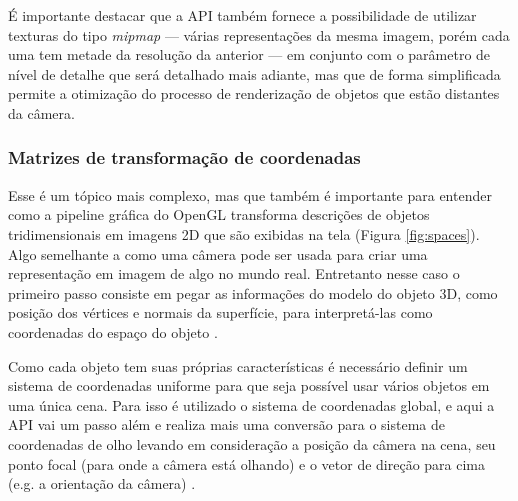 É importante destacar que a API também fornece a possibilidade de utilizar texturas do tipo \textit{mipmap} --- várias representações da mesma imagem, porém cada uma tem metade da resolução da anterior --- em conjunto com o parâmetro de nível de detalhe que será detalhado mais adiante, mas que de forma simplificada permite a otimização do processo de renderização de objetos que estão distantes da câmera. 

\subsubsection{Matrizes de transformação de coordenadas}
\label{sec:matrizes-transformacao-coordenadas}

Esse é um tópico mais complexo, mas que também é importante para entender como a pipeline gráfica do OpenGL transforma descrições de objetos tridimensionais em imagens 2D que são exibidas na tela (Figura \ref{fig:spaces}). Algo semelhante a como uma câmera pode ser usada para criar uma representação em imagem de algo no mundo real. Entretanto nesse caso o primeiro passo consiste em pegar as informações do modelo do objeto 3D, como posição dos vértices e normais da superfície, para interpretá-las como coordenadas do espaço do objeto \cite{GLSLBook}. 

	\begin{figure}[htp]
		\centering
	\end{figure}
	\nocite{spaces}

Como cada objeto tem suas próprias características é necessário definir um sistema de coordenadas uniforme para que seja possível usar vários objetos em uma única cena. Para isso é utilizado o sistema de coordenadas global, e aqui a API vai um passo além e realiza mais uma conversão para o sistema de coordenadas de olho levando em consideração a posição da câmera na cena, seu ponto focal (para onde a câmera está olhando) e o vetor de direção para cima (e.g. a orientação da câmera) \cite{GLSLBook}. 

